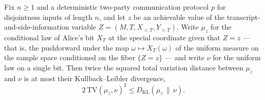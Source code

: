 \begin{theorem}
\label{CommunicationComplexity.Functions.Disjointness.RandomizedLowerBound.two_mul_xDistance_sq_le_xFiberKL}
\leanok
{}
Fix $n \ge 1$ and a deterministic two-party communication protocol $p$ for disjointness
inputs of length $n$, and let $z$ be an achievable value of the
transcript-and-side-information variable $Z = (M, T, X_{<T}, Y_{>T})$. Write $\mu_z$ for
the conditional law of Alice's bit $X_T$ at the special coordinate given that $Z = z$ —
that is, the pushforward under the map $\omega \mapsto X_T(\omega)$ of the uniform
measure on the sample space conditioned on the fiber $\{Z = z\}$ — and write $\nu$ for
the uniform law on a single bit. Then twice the squared total variation distance between
$\mu_z$ and $\nu$ is at most their Kullback–Leibler divergence,
\[
2\,\mathrm{TV}(\mu_z, \nu)^2 \le D_{\mathrm{KL}}(\mu_z \,\|\, \nu).
\]
\end{theorem}

